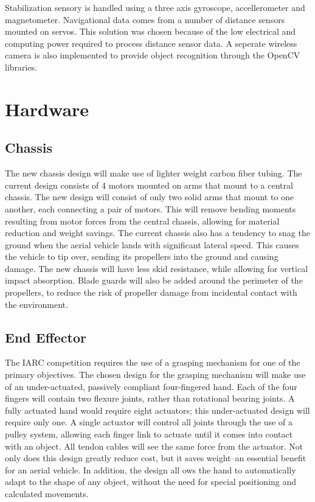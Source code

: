 \documentclass[12pt,letterpaper]{article}
\begin{document}
Stabilization sensory is handled using a three axis gyroscope, 
accellerometer and magnetometer. Navigational data comes from a number of
distance sensors mounted on servos. This solution was chosen because of the
low electrical and computing power required to process distance sensor data.
A seperate wireless camera is also implemented to provide object recognition
through the OpenCV libraries.


\section*{Hardware}

\subsection*{Chassis}

The new chassis design will make use of lighter weight carbon fiber tubing.  The
 current design consists of 4 motors mounted on arms that mount to a central
chassis.  The new design will consist of only two solid arms that mount to one
another, each connecting a pair of motors.  This will remove bending moments
resulting from motor forces from the central chassis, allowing for material
reduction and weight savings.  The current chassis also has a tendency to snag
the ground when the aerial vehicle lands with significant lateral speed.  This
causes the vehicle to tip over, sending its propellers into the ground and
causing damage.  The new chassis will have less skid resistance, while allowing
for vertical impact absorption.  Blade guards will also be added around the
perimeter of the propellers, to reduce the risk of propeller damage from
incidental contact with the environment.


\subsection*{End Effector}

The IARC competition requires the use of a grasping mechanism for one of the
primary objectives.  The chosen design for the grasping mechanism will make use
of an under-actuated, passively compliant four-fingered hand.  Each of the four
fingers will contain two flexure joints, rather than rotational bearing joints.
A fully actuated hand would require eight actuators; this under-actuated design
will require only one.  A single actuator will control all joints through the
use of a pulley system, allowing each finger link to actuate until it comes into
 contact with an object.  All tendon cables will see the same force from the
actuator.  Not only does this design greatly reduce cost, but it saves
weight--an essential benefit for an aerial vehicle.  In addition, the design all
ows the hand to automatically adapt to the shape of any object, without the need
 for special positioning and calculated movements.
\end{document}
